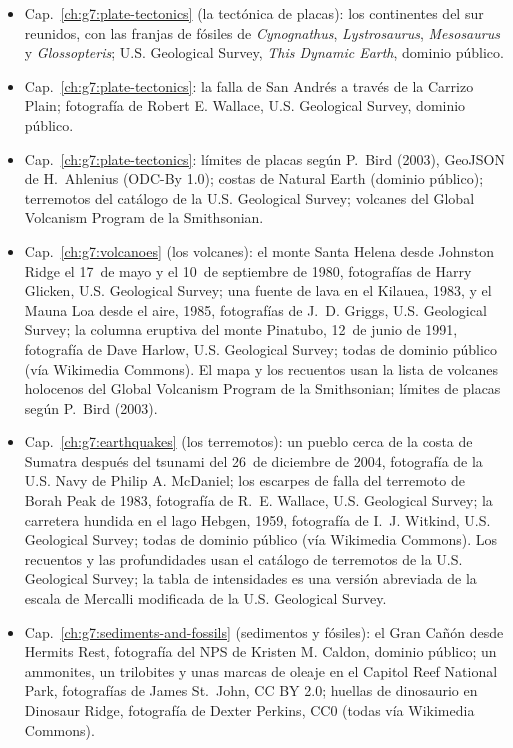\begin{itemize}
  \item Cap.~\ref{ch:g7:plate-tectonics} (la tectónica de placas): los continentes del sur reunidos, con las franjas de fósiles de \emph{Cynognathus}, \emph{Lystrosaurus}, \emph{Mesosaurus} y \emph{Glossopteris}; U.S. Geological Survey, \emph{This Dynamic Earth}, dominio público.
  \item Cap.~\ref{ch:g7:plate-tectonics}: la falla de San Andrés a través de la Carrizo Plain; fotografía de Robert E. Wallace, U.S. Geological Survey, dominio público.
  \item Cap.~\ref{ch:g7:plate-tectonics}: límites de placas según P.~Bird (2003), GeoJSON de H.~Ahlenius (ODC-By 1.0); costas de Natural Earth (dominio público); terremotos del catálogo de la U.S. Geological Survey; volcanes del Global Volcanism Program de la Smithsonian.
  \item Cap.~\ref{ch:g7:volcanoes} (los volcanes): el monte Santa Helena desde Johnston Ridge el 17~de mayo y el 10~de septiembre de 1980, fotografías de Harry Glicken, U.S. Geological Survey; una fuente de lava en el Kilauea, 1983, y el Mauna Loa desde el aire, 1985, fotografías de J.~D. Griggs, U.S. Geological Survey; la columna eruptiva del monte Pinatubo, 12~de junio de 1991, fotografía de Dave Harlow, U.S. Geological Survey; todas de dominio público (vía Wikimedia Commons). El mapa y los recuentos usan la lista de volcanes holocenos del Global Volcanism Program de la Smithsonian; límites de placas según P.~Bird (2003).
  \item Cap.~\ref{ch:g7:earthquakes} (los terremotos): un pueblo cerca de la costa de Sumatra después del tsunami del 26~de diciembre de 2004, fotografía de la U.S. Navy de Philip A. McDaniel; los escarpes de falla del terremoto de Borah Peak de 1983, fotografía de R.~E. Wallace, U.S. Geological Survey; la carretera hundida en el lago Hebgen, 1959, fotografía de I.~J. Witkind, U.S. Geological Survey; todas de dominio público (vía Wikimedia Commons). Los recuentos y las profundidades usan el catálogo de terremotos de la U.S. Geological Survey; la tabla de intensidades es una versión abreviada de la escala de Mercalli modificada de la U.S. Geological Survey.
  \item Cap.~\ref{ch:g7:sediments-and-fossils} (sedimentos y fósiles): el Gran Cañón desde Hermits Rest, fotografía del NPS de Kristen M. Caldon, dominio público; un ammonites, un trilobites y unas marcas de oleaje en el Capitol Reef National Park, fotografías de James St.~John, CC BY 2.0; huellas de dinosaurio en Dinosaur Ridge, fotografía de Dexter Perkins, CC0 (todas vía Wikimedia Commons).

\end{itemize}
